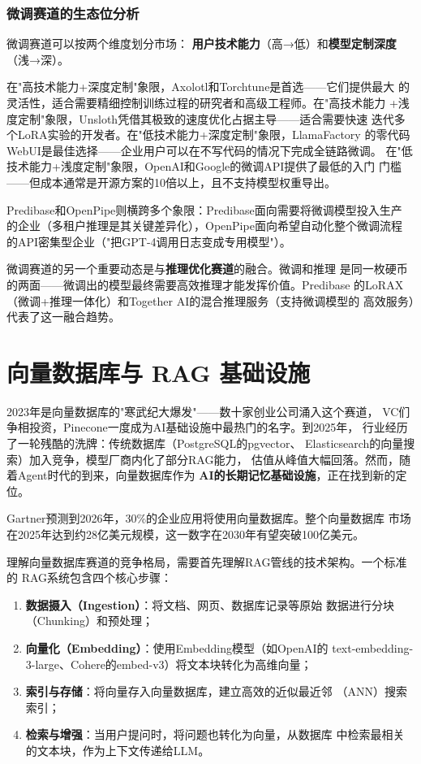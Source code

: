 \subsubsection{微调赛道的生态位分析} 微调赛道可以按两个维度划分市场：
\textbf{用户技术能力}（高→低）和\textbf{模型定制深度}（浅→深）。

在"高技术能力+深度定制"象限，Axolotl和Torchtune是首选——它们提供最大
的灵活性，适合需要精细控制训练过程的研究者和高级工程师。在"高技术能力
+浅度定制"象限，Unsloth凭借其极致的速度优化占据主导——适合需要快速
迭代多个LoRA实验的开发者。在"低技术能力+深度定制"象限，LlamaFactory
的零代码WebUI是最佳选择——企业用户可以在不写代码的情况下完成全链路微调。
在"低技术能力+浅度定制"象限，OpenAI和Google的微调API提供了最低的入门
门槛——但成本通常是开源方案的10倍以上，且不支持模型权重导出。

Predibase和OpenPipe则横跨多个象限：Predibase面向需要将微调模型投入生产
的企业（多租户推理是其关键差异化），OpenPipe面向希望自动化整个微调流程
的API密集型企业（"把GPT-4调用日志变成专用模型"）。

微调赛道的另一个重要动态是与\textbf{推理优化赛道}的融合。微调和推理
是同一枚硬币的两面——微调出的模型最终需要高效推理才能发挥价值。Predibase
的LoRAX（微调+推理一体化）和Together AI的混合推理服务（支持微调模型的
高效服务）代表了这一融合趋势。


\section{向量数据库与 RAG 基础设施}
\label{sec:platform-rag}

2023年是向量数据库的"寒武纪大爆发"——数十家创业公司涌入这个赛道，
VC们争相投资，Pinecone一度成为AI基础设施中最热门的名字。到2025年，
行业经历了一轮残酷的洗牌：传统数据库（PostgreSQL的pgvector、
Elasticsearch的向量搜索）加入竞争，模型厂商内化了部分RAG能力，
估值从峰值大幅回落。然而，随着Agent时代的到来，向量数据库作为
\textbf{AI的长期记忆基础设施}，正在找到新的定位。

Gartner预测到2026年，30\%的企业应用将使用向量数据库。整个向量数据库
市场在2025年达到约28亿美元规模，这一数字在2030年有望突破100亿美元。

理解向量数据库赛道的竞争格局，需要首先理解RAG管线的技术架构。一个标准的
RAG系统包含四个核心步骤：
\begin{enumerate}
  \item \textbf{数据摄入（Ingestion）}：将文档、网页、数据库记录等原始
    数据进行分块（Chunking）和预处理；
  \item \textbf{向量化（Embedding）}：使用Embedding模型（如OpenAI的
    text-embedding-3-large、Cohere的embed-v3）将文本块转化为高维向量；
  \item \textbf{索引与存储}：将向量存入向量数据库，建立高效的近似最近邻
    （ANN）搜索索引；
  \item \textbf{检索与增强}：当用户提问时，将问题也转化为向量，从数据库
    中检索最相关的文本块，作为上下文传递给LLM。
\end{enumerate}

